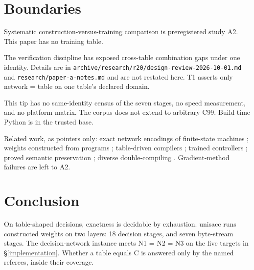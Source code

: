 \documentclass[11pt]{article}
\begin{document}
\section{Boundaries}\label{discussion-and-limitations}

Systematic construction-versus-training comparison is preregistered study A2. This paper has no training table.

The verification discipline has exposed cross-table combination gaps under one identity. Details are in \texttt{archive/research/r20/design-review-2026-10-01.md} and \texttt{research/paper-a-notes.md} and are not restated here. T1 asserts only network = table on one table's declared domain.

This tip has no same-identity census of the seven stages, no speed measurement, and no platform matrix. The corpus does not extend to arbitrary C99. Build-time Python is in the trusted base.

Related work, as pointers only: exact network encodings of finite-state machines \citep{omlin1996,siegelmann1995}; weights constructed from programs \citep{weiss2021,lindner2023}; table-driven compilers \citep{johnson1975,glanville1978,fraser1992}; trained controllers \citep{graves2014}; proved semantic preservation \citep{leroy2009,kumar2014}; diverse double-compiling \citep{wheeler2009}. Gradient-method failures are left to A2.

\section{Conclusion}\label{conclusion}

On table-shaped decisions, exactness is decidable by exhaustion. unisacc runs constructed weights on two layers: 18 decision stages, and seven byte-stream stages. The decision-network instance meets N1 = N2 = N3 on the five targets in \S\ref{implementation}. Whether a table equals C is answered only by the named referees, inside their coverage.
\end{document}
